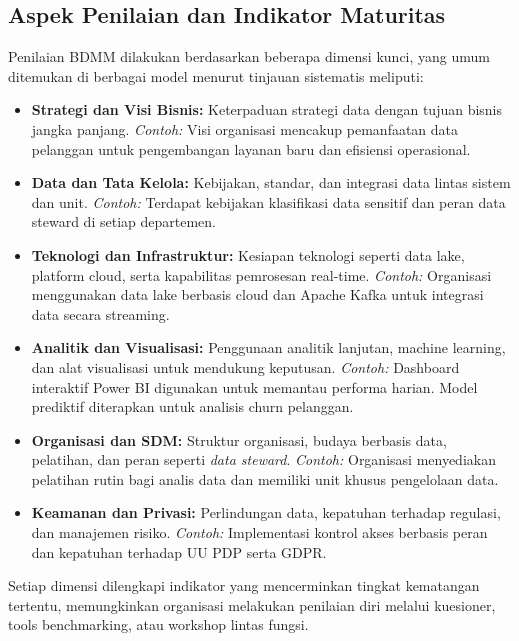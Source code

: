 \subsection{Aspek Penilaian dan Indikator Maturitas}

Penilaian BDMM dilakukan berdasarkan beberapa dimensi kunci, yang umum ditemukan di berbagai model menurut tinjauan sistematis meliputi:

\begin{itemize}
	\item \textbf{Strategi dan Visi Bisnis:} Keterpaduan strategi data dengan tujuan bisnis jangka panjang. \textit{Contoh:} Visi organisasi mencakup pemanfaatan data pelanggan untuk pengembangan layanan baru dan efisiensi operasional.
	
	\item \textbf{Data dan Tata Kelola:} Kebijakan, standar, dan integrasi data lintas sistem dan unit. \textit{Contoh:} Terdapat kebijakan klasifikasi data sensitif dan peran data steward di setiap departemen.
	
	\item \textbf{Teknologi dan Infrastruktur:} Kesiapan teknologi seperti data lake, platform cloud, serta kapabilitas pemrosesan real-time. \textit{Contoh:} Organisasi menggunakan data lake berbasis cloud dan Apache Kafka untuk integrasi data secara streaming.
	
	\item \textbf{Analitik dan Visualisasi:} Penggunaan analitik lanjutan, machine learning, dan alat visualisasi untuk mendukung keputusan. \textit{Contoh:} Dashboard interaktif Power BI digunakan untuk memantau performa harian. Model prediktif diterapkan untuk analisis churn pelanggan.
	
	\item \textbf{Organisasi dan SDM:} Struktur organisasi, budaya berbasis data, pelatihan, dan peran seperti \textit{data steward}. \textit{Contoh:} Organisasi menyediakan pelatihan rutin bagi analis data dan memiliki unit khusus pengelolaan data.
	
	\item \textbf{Keamanan dan Privasi:} Perlindungan data, kepatuhan terhadap regulasi, dan manajemen risiko. \textit{Contoh:} Implementasi kontrol akses berbasis peran dan kepatuhan terhadap UU PDP serta GDPR.
\end{itemize}



Setiap dimensi dilengkapi indikator yang mencerminkan tingkat kematangan tertentu, memungkinkan organisasi melakukan penilaian diri melalui kuesioner, tools benchmarking, atau workshop lintas fungsi.

